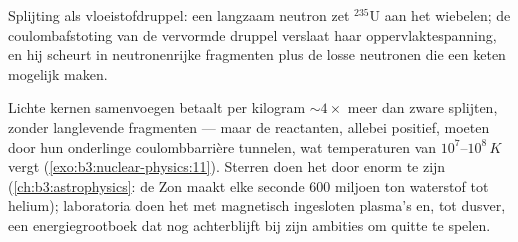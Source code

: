 \begin{omfigure}

{\small Splijting als vloeistofdruppel: een langzaam neutron zet $^{235}$U
aan het wiebelen; de coulombafstoting van de vervormde druppel verslaat haar
oppervlaktespanning, en hij scheurt in neutronenrijke fragmenten plus de losse
neutronen die een keten mogelijk maken.}
\end{omfigure}

\begin{remark}\label{rem:b3:nuclear-physics:fusion}
Lichte kernen samenvoegen betaalt per kilogram $\sim4\times$ meer dan
zware splijten, zonder langlevende fragmenten --- maar de
reactanten, allebei positief, moeten door hun onderlinge coulombbarrière
tunnelen, wat temperaturen van $10^7$--$10^8\,\unit{K}$ vergt
(\cref{exo:b3:nuclear-physics:11}). Sterren doen het door enorm te zijn
(\cref{ch:b3:astrophysics}: de Zon maakt elke seconde \qty{600}{} miljoen
ton waterstof tot helium); laboratoria doen het
met magnetisch ingesloten plasma's en, tot dusver, een energiegrootboek
dat nog achterblijft bij zijn ambities om quitte te spelen.
\end{remark}

